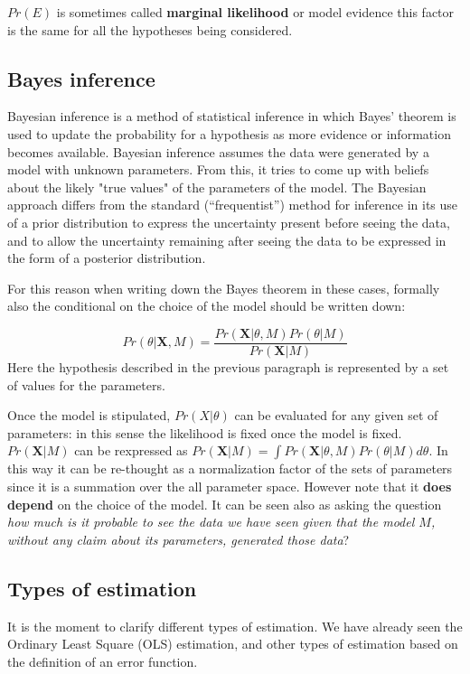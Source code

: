 \documentclass[12pt, letterpaper]{article}
\theoremstyle{definition}
\newcommand{\X}{\mathrm{\mathbf{X}}}
\begin{document}
$Pr(E)$ is sometimes called \textbf{marginal likelihood} or model evidence this factor is the same for all the hypotheses being considered.

\subsection{Bayes inference}
Bayesian inference is a method of statistical inference in which Bayes' theorem is used to update the probability for a hypothesis as more evidence or information becomes available. Bayesian inference assumes the data were generated by a model with unknown parameters. From this, it tries to come up with beliefs about the likely  "true values" of the parameters of the model. The Bayesian approach differs from the standard (“frequentist”) method for inference in its use of a prior distribution to express the uncertainty present before seeing the data, and to allow the uncertainty remaining after seeing the data to be expressed in the form of a posterior distribution.

For this reason when writing down the Bayes theorem in these cases, formally also the conditional on the choice of the model should be written down:

\begin{equation}
Pr(\theta|\X,M) = \frac{Pr(\X|\theta,M)Pr(\theta|M)}{Pr(\X|M)}
\end{equation}
Here the hypothesis described in the previous paragraph is represented by a set of values for the parameters.

Once the model is stipulated, $Pr(X|\theta)$ can be evaluated for any given set of parameters: in this sense the likelihood is fixed once the model is fixed.
$Pr(\X|M)$ can be rexpressed as $Pr(\X|M) =\int Pr(\X|\theta,M)Pr(\theta|M)d\theta$. In this way it can be re-thought as a normalization factor of the sets of parameters since it is a summation over the all parameter space. However note that it \textbf{does depend} on the choice of the model. It can be seen also as asking the question \textit{how much is it probable to see the data we have seen given that the model $M$, without any claim about its parameters, generated those data}?

\subsection{Types of estimation}
It is the moment to clarify different types of estimation. We have already seen the Ordinary Least Square (OLS) estimation, and other types of estimation based on the definition of an error function.
\end{document}
